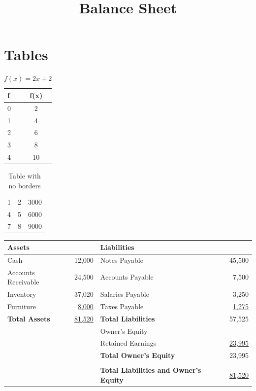 \documentclass[]{article}
\begin{document}
\clearpage

\section{Tables}

\begin{table}[h]
\centering
\begin{tabular}{|l|c|}
\hline
f & f(x)\\\hline
0 & 2\\\hline
1 & 4 \\\hline
2 & 6 \\\hline
3 & 8 \\\hline
4 & 10 \\\hline
\end{tabular}
\caption{$f(x) = 2x+2$}
\end{table}

\begin{table}[h]
\centering
\begin{tabular}{lll}
1 & 2 & 3000\\
4 & 5 & 6000\\
7 & 8 & 9000\\
\end{tabular}
\caption{Table with no borders}
\end{table}

\begin{table}[h]
\centering
\title{Balance Sheet}
\begin{tabular}{lr@{\hskip 1em}lr}
Assets & & Liabilities &\\\hline
Cash & 12,000 & Notes Payable & 45,500\\
Accounts Receivable & 24,500 & Accounts Payable & 7,500\\
Inventory & 37,020 & Salaries Payable & 3,250\\
Furniture & \underline{8,000} & Taxes Payable & \underline{1,275}\\
\textbf{Total Assets}& \underline{\underline{81,520}} & \textbf{Total Liabilities} & 57,525\\
&&Owner's Equity&\\
&&Retained Earnings& \underline{23,995}\\
&&\textbf{Total Owner's Equity}& 23,995\\
&&&\\
&&\textbf{Total Liabilities and Owner's Equity} & \underline{\underline{81,520}}
\end{tabular}
\end{table}
\end{document}
